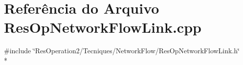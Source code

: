 \section{Referência do Arquivo Res\+Op\+Network\+Flow\+Link.\+cpp}
\label{_res_op_network_flow_link_8cpp}
{\ttfamily \#include \char`\"{}Res\+Operation2/\+Tecniques/\+Network\+Flow/\+Res\+Op\+Network\+Flow\+Link.\+h\char`\"{}}\\*
